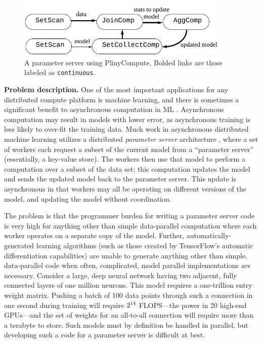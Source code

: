 \begin{figure}[t]
  \begin{center}
    \includegraphics[width=4in]{ParamServer}
  \end{center}
\vspace{-10 pt}
  \caption{A parameter server using PlinyCompute.  Bolded links are those labeled as \texttt{continuous}.}
  \label{fig-param}
\vspace{-15 pt}
\end{figure}


\noindent
\textbf{Problem description.}
One of the most important applications for any distributed compute platform is machine learning, and
there is sometimes a significant
benefit to asynchronous computation in ML \cite{mnih2016asynchronous, dean2012large}.
Asynchronous computation may
result in models with lower error, as asynchronous training is less likely to over-fit the training data.  
Much work in asynchronous distributed machine learning utilizes
a distributed \emph{parameter server} architecture \cite{li2014scaling, ho2013more}, 
where a set of workers each request a subset of the current
model from a ``parameter server'' (essentially, a key-value store).  The workers then use that model 
to perform a computation over a subset of the data set; this computation updates the model and sends
the updated model back to the parameter server.  This update is asynchronous in that
workers may all be operating on different versions of the model, and updating the model without coordination.

The problem is that the programmer burden for writing a parameter server code is very high for anything other than
simple data-parallel computation where each worker operates on a separate copy of the model.  
Further, automatically-generated learning algorithms (such as those created by TensorFlow's automatic differentiation capabilities)
are unable to generate anything other than simple, data-parallel code when
often, complicated, model parallel implementations \emph{are} necessary.
Consider a large, deep neural network having 
two adjacent, fully connected layers of one million neurons.  This model requires a one-trillion entry
weight matrix.  Pushing
a batch of 100 data points through such a connection in one second
during training will require $2 \time 10^{14}$ FLOPS---the power in 20 high-end
GPUs---and the set of weights for an all-to-all connection will require more than a terabyte to store.
Such models must by definition be handled in parallel, but
developing such a code for a parameter server
is difficult at best.

